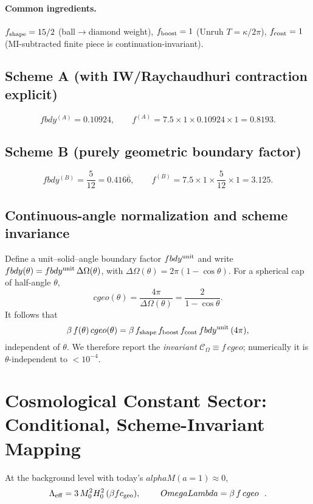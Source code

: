 \documentclass[aps,prd,onecolumn,superscriptaddress,nofootinbib]{revtex4-2}
\def\OmL{OmegaLambda}%
\def\cgeo{cgeo}%
\def\alphaM{alphaM}%
\def\fbdy{fbdy}%
\def\boxed#1{#1}%
\newcommand{\OmL}{\Omega_\Lambda}
\newcommand{\cgeo}{c_{\rm geo}}
\newcommand{\alphaM}{\alpha_M}
\newcommand{\fbdy}{f_{\rm bdy}}
\begin{document}
\paragraph*{Common ingredients.}
$f_{\rm shape}=15/2$ (ball$\to$diamond weight), $f_{\rm boost}=1$ (Unruh $T=\kappa/2\pi$), $f_{\rm cont}=1$ (MI-subtracted finite piece is continuation-invariant).

\subsection{Scheme A (with IW/Raychaudhuri contraction explicit)}
\[
\fbdy^{(A)}=0.10924,\qquad
f^{(A)}=7.5\times 1 \times 0.10924 \times 1=0.8193.
\]

\subsection{Scheme B (purely geometric boundary factor)}
\[
\fbdy^{(B)}=\frac{5}{12}=0.416\overline{6},\qquad
f^{(B)}=7.5\times 1 \times \frac{5}{12}\times 1=3.125.
\]

\subsection{Continuous-angle normalization and scheme invariance}
\label{sec:theta-invariance}
Define a unit--solid--angle boundary factor $\fbdy^{\rm unit}$ and write
$\fbdy(\theta)=\fbdy^{\rm unit}\,\Delta\Omega(\theta)$, with $\Delta\Omega(\theta)=2\pi(1-\cos\theta)$.
For a spherical cap of half-angle $\theta$,
\begin{equation}
\cgeo(\theta)=\frac{4\pi}{\Delta\Omega(\theta)}=\frac{2}{1-\cos\theta}.
\end{equation}
It follows that
\begin{equation}
\beta\,f(\theta)\,\cgeo(\theta)
= \beta\,f_{\rm shape}\,f_{\rm boost}\,f_{\rm cont}\,\fbdy^{\rm unit}\,(4\pi),
\end{equation}
independent of $\theta$. We therefore report the \emph{invariant} $\mathcal C_\Omega\equiv f\,\cgeo$; numerically it is $\theta$-independent to $<10^{-4}$.

\section{Cosmological Constant Sector: Conditional, Scheme-Invariant Mapping}
\label{sec:OmegaL}
At the background level with today’s $\alphaM(a{=}1)\approx 0$,
\begin{equation}
\Lambda_{\rm eff} = 3\,M_0^2 H_0^2\,(\beta f c_{\rm geo}),\qquad
\boxed{\ \OmL = \beta\, f \, \cgeo\ }\ .
\end{equation}
\end{document}
